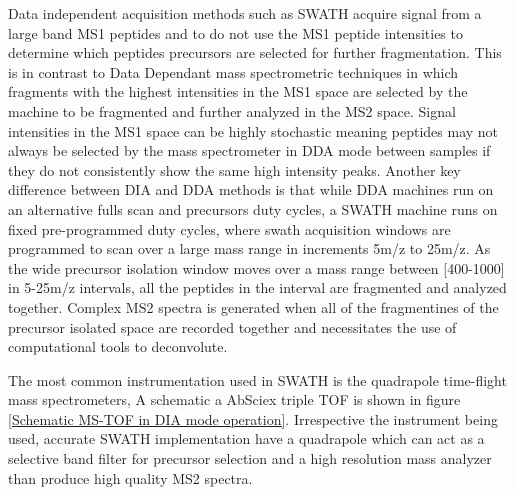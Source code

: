 \documentclass[a4paper]{book}
\begin{document}
	
	Data independent acquisition methods such as SWATH\citep{Gillet2012TargetedAnalysis} acquire signal from a large band MS1 peptides and to do not use the MS1 peptide intensities to determine which peptides precursors are selected for further fragmentation\citep{Venable2004AutomatedSpectra}. This is in contrast to Data Dependant mass spectrometric techniques in which fragments with the highest intensities in the MS1 space are selected by the machine to be fragmented and further analyzed in the MS2 space. Signal intensities in the MS1 space can be highly stochastic meaning peptides may not always be selected by the mass spectrometer in DDA mode between samples if they do not consistently show the same high intensity peaks. Another key difference between DIA and DDA methods is that while DDA machines run on an alternative fulls scan and precursors duty cycles, a SWATH machine runs on fixed pre-programmed duty cycles, where swath acquisition windows are programmed to scan over a large mass range in increments 5m/z to 25m/z\citep{Rost2017AutomatedChromatograms}. As the wide precursor isolation window moves over a mass range between [400-1000] in 5-25m/z intervals, all the peptides in the interval are fragmented and analyzed together. Complex MS2 spectra is generated when all of the fragmentines of the precursor isolated space are recorded together and necessitates the use of computational tools to deconvolute. 
	
	The most common instrumentation used in SWATH is the quadrapole time-flight mass spectrometers, A schematic a AbSciex triple TOF is shown in figure \ref{Schematic MS-TOF in DIA mode operation}. Irrespective the instrument being used, accurate SWATH implementation have a quadrapole which can act as a selective band filter for precursor selection and a high resolution mass analyzer than produce high quality MS2 spectra.
		
\end{document}
